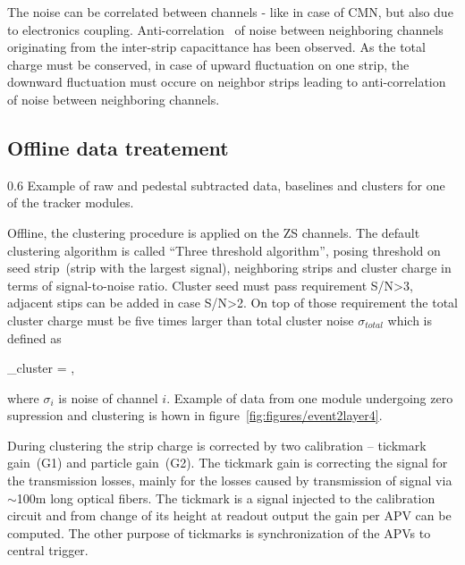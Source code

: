 The noise can be correlated between channels - like in case of CMN, but also due to electronics coupling. Anti-correlation~\cite{Lutz:1987wd} of noise between neighboring channels originating from the inter-strip capacittance has been observed. As the total charge must be conserved, in case of upward fluctuation on one strip, the downward fluctuation must occure on neighbor strips leading to anti-correlation of noise between neighboring channels.

\subsection{Offline data treatement}

                 {0.6}       %
                 {Example of raw and pedestal subtracted data, baselines and clusters for one of the tracker modules.} %

Offline, the clustering procedure is applied on the ZS channels. The default clustering algorithm is called ``Three threshold algorithm'', posing threshold on seed strip~(strip with the largest signal), neighboring strips and cluster charge in terms of signal-to-noise ratio. Cluster seed must pass requirement S/N>3, adjacent stips can be added in case S/N>2. On top of those requirement the total cluster charge must be five times larger than total cluster noise $\sigma_{total}$ which is defined as

{
    \sigma_{cluster} = ,
}

where $\sigma_{i}$ is noise of channel $i$. Example of data from one module undergoing zero supression and clustering is hown in figure~\ref{fig:figures/event2layer4}.

During clustering the strip charge is corrected by two calibration -- tickmark gain~(G1) and particle gain~(G2). The tickmark gain is correcting the signal for the transmission losses, mainly for the losses caused by transmission of signal via $\sim$100m long optical fibers. The tickmark is a signal injected to the calibration circuit and from change of its height at readout output the gain per APV can be computed. The other purpose of tickmarks is synchronization of the APVs to central trigger.

